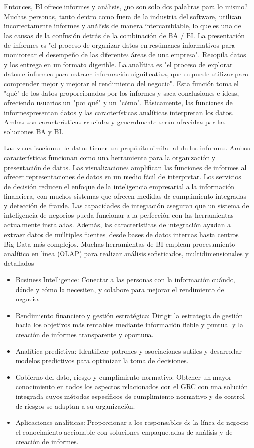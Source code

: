 \documentclass[%
 reprint,
 amsmath,amssymb,
 aps,
]{revtex4-1}
\begin{document}
Entonces, BI ofrece informes y análisis, ¿no son solo dos palabras para lo mismo? Muchas personas, tanto dentro como fuera de la industria del software, utilizan incorrectamente informes y análisis de manera intercambiable, lo que es una de las causas de la confusión detrás de la combinación de BA / BI.
La presentación de informes es "el proceso de organizar datos en resúmenes informativos para monitorear el desempeño de las diferentes áreas de una empresa". Recopila datos y los entrega en un formato digerible.
La analítica es "el proceso de explorar datos e informes para extraer información significativa, que se puede utilizar para comprender mejor y mejorar el rendimiento del negocio". Esta función toma el "qué" de los datos proporcionados por los informes y saca conclusiones e ideas, ofreciendo usuarios un "por qué" y un "cómo". Básicamente, las funciones de informespresentan datos y las características analíticas interpretan los datos. Ambas son características cruciales y generalmente serán ofrecidas por las soluciones BA y BI.

Las visualizaciones de datos tienen un propósito similar al de los informes. Ambas características funcionan como una herramienta para la organización y presentación de datos. Las visualizaciones amplifican las funciones de informes al ofrecer representaciones de datos en un medio fácil de interpretar. Los servicios de decisión reducen el enfoque de la inteligencia empresarial a la información financiera, con muchos sistemas que ofrecen medidas de cumplimiento integradas y detección de fraude.
Las capacidades de integración aseguran que un sistema de inteligencia de negocios pueda funcionar a la perfección con las herramientas actualmente instaladas. Además, las características de integración ayudan a extraer datos de múltiples fuentes, desde bases de datos internas hasta centros Big Data más complejos. Muchas herramientas de BI emplean procesamiento analítico en línea (OLAP) para realizar análisis sofisticados, multidimensionales y detallados
\begin{itemize}
\item Business Intelligence: Conectar a las personas con la información cuándo, dónde y cómo lo necesiten, y colabore para mejorar el rendimiento de negocio.
\item Rendimiento financiero y gestión estratégica: Dirigir la estrategia de gestión hacia los objetivos más rentables mediante información fiable y puntual y la creación de informes transparente y oportuna.
\item Analítica predictiva: Identificar patrones y asociaciones sutiles y desarrollar modelos predictivos para optimizar la toma de decisiones.
\item Gobierno del dato, riesgo y cumplimiento normativo: Obtener un mayor conocimiento en todos los aspectos relacionados con el GRC con una solución integrada cuyos métodos específicos de cumplimiento normativo y de control de riesgos se adaptan a su organización.
\item Aplicaciones analíticas: Proporcionar a los responsables de la línea de negocio el conocimiento accionable con soluciones empaquetadas de análisis y de creación de informes.


	\end{itemize} 
\end{document}
